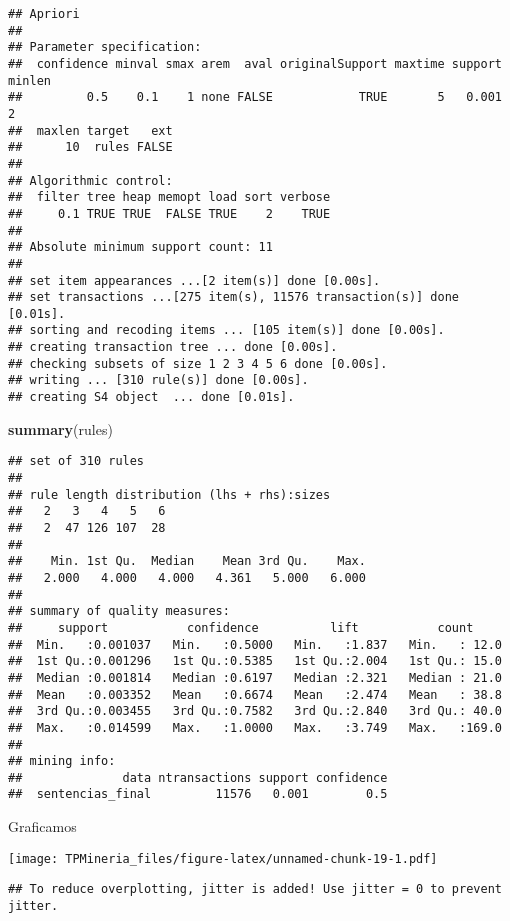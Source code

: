 \documentclass[runningheads,a4paper]{llncs}
\newenvironment{Shaded}{}{}
\newcommand{\KeywordTok}[1]{\textcolor[rgb]{0.00,0.44,0.13}{\textbf{{#1}}}}
\newcommand{\NormalTok}[1]{{#1}}
\begin{document}
\begin{verbatim}
## Apriori
## 
## Parameter specification:
##  confidence minval smax arem  aval originalSupport maxtime support minlen
##         0.5    0.1    1 none FALSE            TRUE       5   0.001      2
##  maxlen target   ext
##      10  rules FALSE
## 
## Algorithmic control:
##  filter tree heap memopt load sort verbose
##     0.1 TRUE TRUE  FALSE TRUE    2    TRUE
## 
## Absolute minimum support count: 11 
## 
## set item appearances ...[2 item(s)] done [0.00s].
## set transactions ...[275 item(s), 11576 transaction(s)] done [0.01s].
## sorting and recoding items ... [105 item(s)] done [0.00s].
## creating transaction tree ... done [0.00s].
## checking subsets of size 1 2 3 4 5 6 done [0.00s].
## writing ... [310 rule(s)] done [0.00s].
## creating S4 object  ... done [0.01s].
\end{verbatim}

\begin{Shaded}
\begin{Highlighting}[]
\KeywordTok{summary}\NormalTok{(rules)}
\end{Highlighting}
\end{Shaded}

\begin{verbatim}
## set of 310 rules
## 
## rule length distribution (lhs + rhs):sizes
##   2   3   4   5   6 
##   2  47 126 107  28 
## 
##    Min. 1st Qu.  Median    Mean 3rd Qu.    Max. 
##   2.000   4.000   4.000   4.361   5.000   6.000 
## 
## summary of quality measures:
##     support           confidence          lift           count      
##  Min.   :0.001037   Min.   :0.5000   Min.   :1.837   Min.   : 12.0  
##  1st Qu.:0.001296   1st Qu.:0.5385   1st Qu.:2.004   1st Qu.: 15.0  
##  Median :0.001814   Median :0.6197   Median :2.321   Median : 21.0  
##  Mean   :0.003352   Mean   :0.6674   Mean   :2.474   Mean   : 38.8  
##  3rd Qu.:0.003455   3rd Qu.:0.7582   3rd Qu.:2.840   3rd Qu.: 40.0  
##  Max.   :0.014599   Max.   :1.0000   Max.   :3.749   Max.   :169.0  
## 
## mining info:
##              data ntransactions support confidence
##  sentencias_final         11576   0.001        0.5
\end{verbatim}

Graficamos

\texttt{[image: TPMineria\_files/figure-latex/unnamed-chunk-19-1.pdf]}

\begin{verbatim}
## To reduce overplotting, jitter is added! Use jitter = 0 to prevent jitter.
\end{verbatim}
\end{document}
